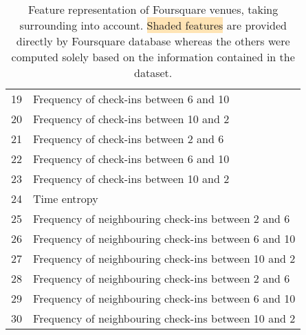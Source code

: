 \begin{table}[hb]
\begin{tabularx}{\textwidth}{lX}
	19 & Frequency of check-ins between 6 \am{} and 10 \am{} \\
	20 & Frequency of check-ins between 10 \am{} and 2 \hpm{} \\
	21 & Frequency of check-ins between 2 \hpm{} and 6 \hpm{} \\
	22 & Frequency of check-ins between 6 \hpm{} and 10 \hpm{} \\
	23 & Frequency of check-ins between 10 \hpm{} and 2 \am{} \\
	24 & Time entropy \\
	25 & Frequency of neighbouring check-ins between 2 \am{} and 6 \am{} \\
	26 & Frequency of neighbouring check-ins between 6 \am{} and 10 \am{} \\
	27 & Frequency of neighbouring check-ins between 10 \am{} and 2 \hpm{} \\
	28 & Frequency of neighbouring check-ins between 2 \hpm{} and 6 \hpm{} \\
	29 & Frequency of neighbouring check-ins between 6 \hpm{} and 10 \hpm{} \\
	30 & Frequency of neighbouring check-ins between 10 \hpm{} and 2 \am{} \\
        \bottomrule
    \end{tabularx}
    \caption[Venue features]{Feature representation of Foursquare venues,
	    taking surrounding into account. \colorbox{Moccasin}{Shaded
	    features} are provided directly by Foursquare database whereas the
	    others were computed solely based on the information
	    contained in the dataset.\label{tab:venuefeatures}}
\end{table}
